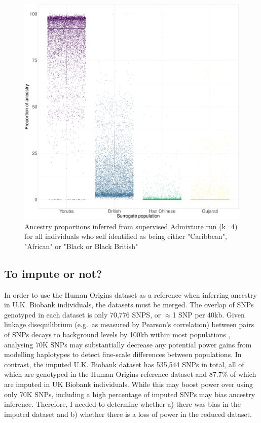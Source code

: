 \begin{figure}[htp]
    \centering
    \includegraphics[width=1.0\textwidth]{../images/chapter3/African_Inds_proportions.pdf}
    \caption{Ancestry proportions inferred from supervised Admixture run (k=4) for all individuals who self identified as being either "Caribbean", "African" or "Black or Black British"}
    \label{fig:African_Inds_proportions_ADMIXTURE}
\end{figure}

\subsection{To impute or not?}

In order to use the Human Origins dataset as a reference when inferring ancestry in U.K. Biobank individuals, the datasets must be merged. The overlap of SNPs genotyped in each dataset is only 70,776 SNPS, or $\approx$1 SNP per 40kb. Given linkage disequilibrium (e.g.\ as measured by Pearson's correlation) between pairs of SNPs decays to background levels by 100kb within most populations \cite{bosch2009decay}, analysing 70K SNPs may substantially decrease any potential power gains from modelling haplotypes to detect fine-scale differences between populations. In contrast, the imputed U.K. Biobank dataset has 535,544 SNPs in total, all of which are genotyped in the Human Origins reference dataset and 87.7\% of which are imputed in UK Biobank individuals. While this may boost power over using only 70K SNPs, including a high percentage of imputed SNPs may bias ancestry inference. Therefore, I needed to determine whether a) there was bias in the imputed dataset and b) whether there is a loss of power in the reduced dataset.

